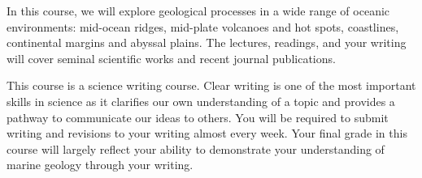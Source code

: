 
In this course, we will explore geological processes in a wide range of oceanic environments: mid-ocean ridges, mid-plate volcanoes and hot spots, coastlines, continental margins and abyssal plains. The lectures, readings, and your writing will cover seminal scientific works and recent journal publications.

This course is a science writing course. Clear writing is one of the most important skills in science as it clarifies our own understanding of a topic and provides a pathway to communicate our ideas to others. You will be required to submit writing and revisions to your writing almost every week. Your final grade in this course will largely reflect your ability to demonstrate your understanding of marine geology through your writing.
